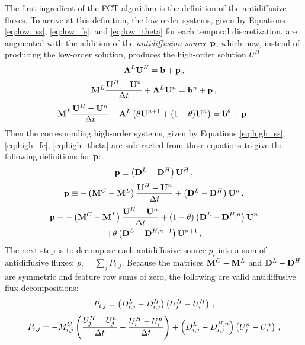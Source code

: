 The first ingredient of the FCT algorithm is the definition of the antidiffusive
fluxes. To arrive at this definition, the low-order systems, given by Equations
\ref{eq:low_ss}, \ref{eq:low_fe}, and \ref{eq:low_theta} for each temporal
discretization, are augmented with the addition of the \emph{antidiffusion source}
$\mathbf{p}$, which now, instead of producing the low-order solution, produces the high-order
solution $U^H$.
\begin{equation}\label{eq:antidiffusionsource_ss}
  \mathbf{A}^L \mathbf{U}^H = \mathbf{b} + \mathbf{p} \,,
\end{equation}
\begin{equation}\label{eq:antidiffusionsource_fe}
  \mathbf{M}^L\frac{\mathbf{U}^H - \mathbf{U}^n}{\Delta t} + \mathbf{A}^L\mathbf{U}^n = \mathbf{b}^n + \mathbf{p} \,,
\end{equation}
\begin{equation}\label{eq:antidiffusionsource_theta}
  \mathbf{M}^L\frac{\mathbf{U}^H - \mathbf{U}^n}{\Delta t} + \mathbf{A}^L\left(\theta\mathbf{U}^{n+1} + (1-\theta)\mathbf{U}^n\right)
    = \mathbf{b}^\theta + \mathbf{p} \,.
\end{equation}
Then the corresponding high-order systems, given by Equations \ref{eq:high_ss},
\ref{eq:high_fe}, \ref{eq:high_theta} are subtracted from these equations
to give the following definitions for $\mathbf{p}$:
\begin{equation}\label{eq:antidiffusionsourcei_ss}
  \mathbf{p} \equiv \left(\mathbf{D}^L - \mathbf{D}^H\right)\mathbf{U}^H \,,
\end{equation}
\begin{equation}\label{eq:antidiffusionsourcei_fe}
  \mathbf{p} \equiv -\left(\mathbf{M}^C - \mathbf{M}^L\right)\frac{\mathbf{U}^H - \mathbf{U}^n}{\Delta t} + \left(\mathbf{D}^L - \mathbf{D}^H\right)\mathbf{U}^n \,,
\end{equation}
\begin{multline}\label{eq:antidiffusionsourcei_theta}
  \mathbf{p} \equiv -\left(\mathbf{M}^C - \mathbf{M}^L\right)\frac{\mathbf{U}^H - \mathbf{U}^n}{\Delta t}
    + (1-\theta)\left(\mathbf{D}^L - \mathbf{D}^{H,n}\right)\mathbf{U}^n\\
    + \theta    \left(\mathbf{D}^L - \mathbf{D}^{H,n+1}\right)\mathbf{U}^{n+1} \,,
\end{multline}
The next step is to decompose each antidiffusive source $p_i$ into a sum of
antidiffusive fluxes: $p_i = \sum_j P_{i,j}$. Because the matrices $\mathbf{M}^C-\mathbf{M}^L$
and $\mathbf{D}^L-\mathbf{D}^H$ are symmetric and feature row sums of zero, the following
are valid antidiffusive flux decompositions:
\begin{equation}
  P_{i,j} = \left(D^L_{i,j} - D^H_{i,j}\right)\left(U^H_j - U^H_i\right) \,,
\end{equation}
\begin{equation}
  P_{i,j} = -M^C_{i,j}\left(\frac{U^H_j - U^n_j}{\Delta t} - \frac{U^H_i - U^n_i}{\Delta t}\right)
    + \left(D^L_{i,j} - D^{H,n}_{i,j}\right)\left(U^n_j - U^n_i\right)  \,,
\end{equation}
